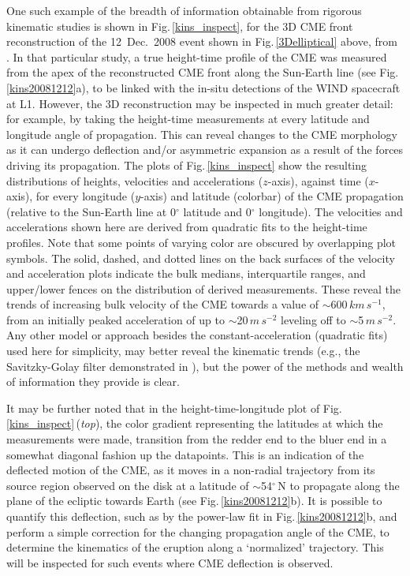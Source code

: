 \documentclass[preprint2]{aastex}
\begin{document}
One such example of the breadth of information obtainable from rigorous kinematic studies is shown in Fig.\,\ref{kins_inspect}, for the 3D CME front reconstruction of the 12~Dec.~2008 event shown in Fig.\,\ref{3Delliptical} above, from \citealt{2010NatCo...1E..74B}. In that particular study, a true height-time profile of the CME was measured from the apex of the reconstructed CME front along the Sun-Earth line (see Fig.\,\ref{kins20081212}a), to be linked with the in-situ detections of the WIND spacecraft at L1. However, the 3D reconstruction may be inspected in much greater detail: for example, by taking the height-time measurements at every latitude and longitude angle of propagation. This can reveal changes to the CME morphology as it can undergo deflection and/or asymmetric expansion as a result of the forces driving its propagation. The plots of Fig.\,\ref{kins_inspect} show the resulting distributions of heights, velocities and accelerations ($z$-axis), against time ($x$-axis), for every longitude ($y$-axis) and latitude (colorbar) of the CME propagation (relative to the Sun-Earth line at 0$^{\circ}$ latitude and 0$^{\circ}$ longitude). The velocities and accelerations shown here are derived from quadratic fits to the height-time profiles. Note that some points of varying color are obscured by overlapping plot symbols. The solid, dashed, and dotted lines on the back surfaces of the velocity and acceleration plots indicate the bulk medians, interquartile ranges, and upper/lower fences on the distribution of derived measurements. These reveal the trends of increasing bulk velocity of the CME towards a value of $\sim$600$\,km\,s^{-1}$, from an initially peaked acceleration of up to $\sim$20$\,m\,s^{-2}$ leveling off to $\sim$5$\,m\,s^{-2}$. Any other model or approach besides the constant-acceleration (quadratic fits) used here for simplicity, may better reveal the kinematic trends (e.g., the Savitzky-Golay filter demonstrated in \citealt{2013arXiv1307.8155B}), but the power of the methods and wealth of information they provide is clear.

It may be further noted that in the height-time-longitude plot of Fig.\,\ref{kins_inspect}\,(\emph{top}), the color gradient representing the latitudes at which the measurements were made, transition from the redder end to the bluer end in a somewhat diagonal fashion up the datapoints. This is an indication of the deflected motion of the CME, as it moves in a non-radial trajectory from its source region observed on the disk at a latitude of $\sim$54$^{\circ}$\,N to propagate along the plane of the ecliptic towards Earth (see Fig.\,\ref{kins20081212}b). It is possible to quantify this deflection, such as by the power-law fit in Fig.\,\ref{kins20081212}b, and perform a simple correction for the changing propagation angle of the CME, to determine the kinematics of the eruption along a `normalized' trajectory. This will be inspected for such events where CME deflection is observed.
\end{document}
